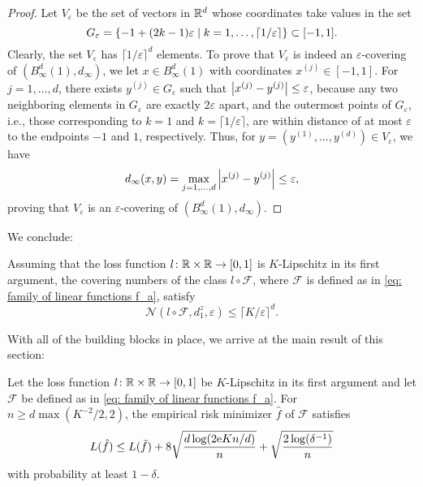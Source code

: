 \begin{proof}
Let $V_{\varepsilon}$ be the set of vectors in $\mathbb{R}^d$ whose coordinates take values in the set
\[
    G_{\varepsilon} = \set{-1 + (2k - 1)\varepsilon \with k = 1, \dots, \lceil 1 / \varepsilon \rceil} \subset [-1, 1].
\]
Clearly, the set $V_{\varepsilon}$ has $\lceil 1 / \varepsilon \rceil^d$ elements. To prove that $V_{\varepsilon}$ is indeed an $\varepsilon$-covering of $(B_{\infty}^d(1), d_{\infty})$, we let $x \in B_{\infty}^d(1)$ with coordinates $x^{(j)} \in [-1, 1]$. For $j = 1, \dots, d$, there exists $y^{(j)} \in G_{\varepsilon}$ such that $\abs{x^{(j)} - y^{(j)}} \leq \varepsilon$, because any two neighboring elements in $G_{\varepsilon}$ are exactly $2 \varepsilon$ apart, and the outermost points of $G_{\varepsilon}$, i.e., those corresponding to $k = 1$ and $k = \lceil 1 / \varepsilon \rceil$, are within distance of at most $\varepsilon$ to the endpoints $-1$ and $1$, respectively. Thus, for $y = (y^{(1)}, \dots, y^{(d)}) \in V_{\varepsilon}$, we have
\[
    d_{\infty}(x, y) = \max_{j = 1, \dots, d} \abs{x^{(j)} - y^{(j)}} \leq \varepsilon,
\]
proving that $V_{\varepsilon}$ is an $\varepsilon$-covering of $(B_{\infty}^d(1), d_{\infty})$.
\end{proof}

We conclude:

\begin{corollary}
\label{cor: final bound on covering numbers of linear functions}
Assuming that the loss function $l \colon \mathbb{R} \times \mathbb{R} \to [0, 1]$ is $K$-Lipschitz in its first argument, the covering numbers of the class $l \circ \mathcal{F}$, where $\mathcal{F}$ is defined as in \eqref{eq: family of linear functions f_a}, satisfy
\[
    \mathcal{N}(l \circ \mathcal{F}, d_1^z, \varepsilon) \leq {\lceil K / \varepsilon \rceil}^d.
\]
\end{corollary}

With all of the building blocks in place, we arrive at the main result of this section:

\begin{theorem}
Let the loss function $l \colon \mathbb{R} \times \mathbb{R} \to [0, 1]$ be $K$-Lipschitz in its first argument and let $\mathcal{F}$ be defined as in \eqref{eq: family of linear functions f_a}. For $n \geq d \max(K^{-2}/2, 2)$, the empirical risk minimizer $\hat{f}$ of $\mathcal{F}$ satisfies
\[
    L(\hat{f}) \leq L(\bar{f}) + 8 \sqrt{\frac{d \log(2\mathrm{e} Kn / d)}{n}} + \sqrt{\frac{2 \log(\delta^{-1})}{n}}
\]
with probability at least $1 - \delta$.
\end{theorem}

